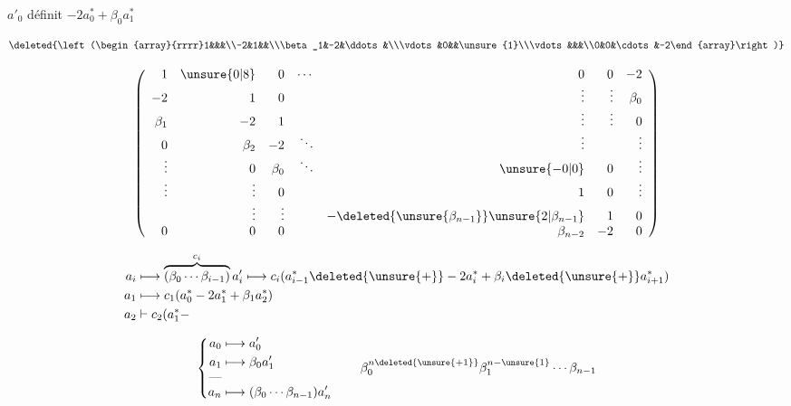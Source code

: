
$a'_0$ définit $-2a_0^*+\beta_0a_1^*$

\[
\deleted{\left(\begin{array}{rrrr}1&&&\\-2&1&&\\\beta_1&-2&\ddots&\\\vdots&0&&\unsure{1}\\\vdots&&&\\0&0&\cdots&-2\end{array}\right)}
\]

\[
\left(\begin{array}{rrrrrrr}
1&\unsure{0|8}&0&\cdots&0&0&-2\\
-2&1&0&&\vdots&\vdots&\beta_0\\
\beta_1&-2&1&&\vdots&\vdots&0\\
0&\beta_2&-2&\ddots&\vdots&&\vdots\\
\vdots&0&\beta_0&\ddots&\unsure{-0|0}&0&\vdots\\
\vdots&\vdots&0&&1&0&\vdots\\
&\vdots&\vdots&&-\deleted{\unsure{\beta_{n-1}}}\unsure{2|\beta_{n-1}}&1&0\\
0&0&0&&\beta_{n-2}&-2&0
\end{array}\right)
\]


\[
\begin{aligned}
a_i&\longmapsto\overbrace{(\beta_0\cdots\beta_{i-1})}^{c_i}a'_i\longmapsto c_i(a_{i-1}^*\deleted{\unsure{+}}-2a_i^*+\beta_i\deleted{\unsure{+}}a_{i+1}^*)\\
a_1&\longmapsto c_1(a_0^*-2a_1^*+\beta_1a_2^*)\\
a_2&\mathrel{\vdash} c_2(a_1^*-
\end{aligned}
\]

\[
\left\{\begin{aligned}a_0&\longmapsto a'_0\\a_1&\longmapsto\beta_0a'_1\\[-3pt]
\text{---}&\\[-3pt]a_n&\longmapsto(\beta_0\cdots\beta_{n-1})a'_n\end{aligned}\right.
\qquad
\beta_0^{n\deleted{\unsure{+1}}}\beta_1^{n-\unsure{1}}\cdots\beta_{n-1}
\]

